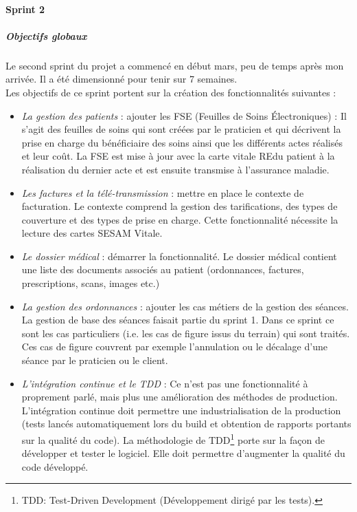 \paragraph*{Sprint 2}
\subparagraph{Objectifs globaux}
Le second sprint du projet a commencé en début mars, peu de temps après mon arrivée. Il a été dimensionné pour tenir sur 7 semaines.\\
Les objectifs de ce sprint portent sur la création des fonctionnalités suivantes : 
\begin{itemize}
	\item \textit{La gestion des patients} : ajouter les \gls{FSE} (Feuilles de Soins Électroniques) : Il s'agit des feuilles de soins qui sont créées par le praticien et qui décrivent la prise en charge du bénéficiaire des soins ainsi que les différents actes réalisés et leur coût. La \gls{FSE} est mise à jour avec la carte vitale REdu patient à la réalisation du dernier acte et est ensuite transmise à l'assurance maladie.
	
	\item \textit{Les factures et la télé-transmission} : mettre en place le contexte de facturation. Le contexte comprend la gestion des tarifications, des types de couverture et des types de prise en charge. Cette fonctionnalité nécessite la lecture des cartes SESAM Vitale.

	\item \textit{Le dossier médical} : démarrer la fonctionnalité. Le dossier médical contient une liste des documents associés au patient (ordonnances, factures, prescriptions, scans, images etc.)
	
	\item \textit{La gestion des ordonnances} : ajouter les cas métiers de la gestion des séances. La gestion de base des séances faisait partie du sprint 1. Dans ce sprint ce sont les cas particuliers (i.e. les cas de figure issus du terrain) qui sont traités. Ces cas de figure couvrent par exemple l'annulation ou le décalage d'une séance par le praticien ou le client.

	\item \textit{L'intégration continue et le TDD} : Ce n'est pas une fonctionnalité à proprement parlé, mais plus une amélioration des méthodes de production. L'intégration continue doit permettre une industrialisation de la production (tests lancés automatiquement lors du build et obtention de rapports portants sur la qualité du code). La méthodologie de TDD\footnote{TDD: Test-Driven Development (Développement dirigé par les tests).} porte sur la façon de développer et tester le logiciel. Elle doit permettre d'augmenter la qualité du code développé.
\end{itemize}

